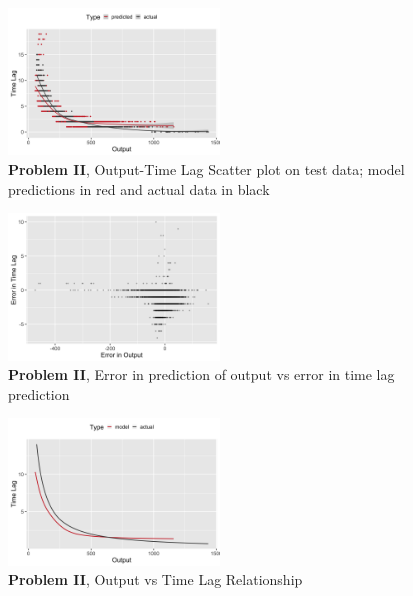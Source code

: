 \documentclass[twoside]{article}
\begin{document}
\begin{figure}[h]
\vspace{.3in}
\centerline{\includegraphics[width=0.5\textwidth]{figures/exp2_scatter_v_tl.png}}
\vspace{.3in}
\caption{\textbf{Problem II}, Output-Time Lag Scatter plot on test data; model predictions in red and actual data in black}
\label{fig:problem2_scatter}
\end{figure}

\begin{figure}[h]
\vspace{.3in}
\centerline{\includegraphics[width=0.5\textwidth]{figures/exp2_scatter_errors_test.png}}
\vspace{.3in}
\caption{\textbf{Problem II}, Error in prediction of output vs error in time lag prediction}
\label{fig:problem2_error}
\end{figure}

\begin{figure}[h]
\vspace{.3in}
\centerline{\includegraphics[width=0.5\textwidth]{figures/exp2_predictive_curves.png}}
\vspace{.3in}
\caption{\textbf{Problem II}, Output vs Time Lag Relationship}
\label{fig:problem2_curves}
\end{figure}
\end{document}

